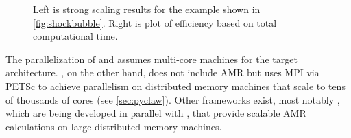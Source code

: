 \begin{figure}[h]
  \begin{center}
    \hfil
  \end{center}
  \caption{Left is strong scaling results for the \amrclaw example shown in
    \cref{fig:shockbubble}.
    Right is plot of efficiency based on total computational time.}
  \label{fig:amr_scaling}
\end{figure}

The parallelization of \amrclaw and \geoclaw assumes multi-core machines for the
target architecture.  \pyclaw, on the other hand, does not include AMR but uses
MPI via PETSc to achieve parallelism on distributed memory machines that scale
to tens of thousands of cores (see \cref{sec:pyclaw}). Other frameworks exist,
most notably \forestclaw \cite{Burstedde:we}, which are being developed in
parallel with \amrclaw, that provide scalable AMR calculations on large
distributed
memory machines.
